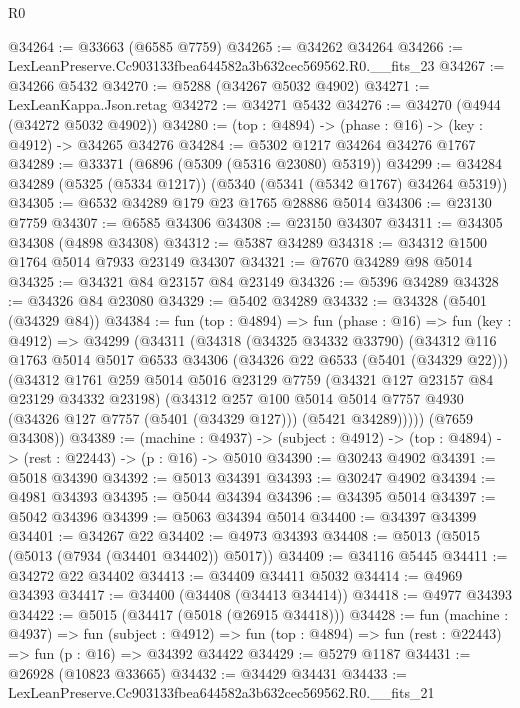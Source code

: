 \begin{lexlean}{R0}
\begin{coremodule}
@34264 := @33663 (@6585 @7759)
@34265 := @34262 @34264
@34266 := LexLeanPreserve.Cc903133fbea644582a3b632cec569562.R0.__fits_23
@34267 := @34266 @5432
@34270 := @5288 (@34267 @5032 @4902)
@34271 := LexLeanKappa.Json.retag
@34272 := @34271 @5432
@34276 := @34270 (@4944 (@34272 @5032 @4902))
@34280 := (top : @4894) -> (phase : @16) -> (key : @4912) -> @34265 @34276
@34284 := @5302 @1217 @34264 @34276 @1767
@34289 := @33371 (@6896 (@5309 (@5316 @23080) @5319))
@34299 := @34284 @34289 (@5325 (@5334 @1217)) (@5340 (@5341 (@5342 @1767) @34264 @5319))
@34305 := @6532 @34289 @179 @23 @1765 @28886 @5014
@34306 := @23130 @7759
@34307 := @6585 @34306
@34308 := @23150 @34307
@34311 := @34305 @34308 (@4898 @34308)
@34312 := @5387 @34289
@34318 := @34312 @1500 @1764 @5014 @7933 @23149 @34307
@34321 := @7670 @34289 @98 @5014
@34325 := @34321 @84 @23157 @84 @23149
@34326 := @5396 @34289
@34328 := @34326 @84 @23080
@34329 := @5402 @34289
@34332 := @34328 (@5401 (@34329 @84))
@34384 := fun (top : @4894) =>
  fun (phase : @16) =>
  fun (key : @4912) =>
  @34299
    (@34311
      (@34318
        (@34325 @34332 @33790)
        (@34312
          @116
          @1763
          @5014
          @5017
          @6533
          @34306
          (@34326 @22 @6533 (@5401 (@34329 @22)))
          (@34312
            @1761
            @259
            @5014
            @5016
            @23129
            @7759
            (@34321 @127 @23157 @84 @23129 @34332 @23198)
            (@34312
              @257
              @100
              @5014
              @5014
              @7757
              @4930
              (@34326 @127 @7757 (@5401 (@34329 @127)))
              (@5421 @34289)))))
      (@7659 @34308))
@34389 := (machine : @4937) ->
  (subject : @4912) -> (top : @4894) -> (rest : @22443) -> (p : @16) -> @5010
@34390 := @30243 @4902
@34391 := @5018 @34390
@34392 := @5013 @34391
@34393 := @30247 @4902
@34394 := @4981 @34393
@34395 := @5044 @34394
@34396 := @34395 @5014
@34397 := @5042 @34396
@34399 := @5063 @34394 @5014
@34400 := @34397 @34399
@34401 := @34267 @22
@34402 := @4973 @34393
@34408 := @5013 (@5015 (@5013 (@7934 (@34401 @34402)) @5017))
@34409 := @34116 @5445
@34411 := @34272 @22 @34402
@34413 := @34409 @34411 @5032
@34414 := @4969 @34393
@34417 := @34400 (@34408 (@34413 @34414))
@34418 := @4977 @34393
@34422 := @5015 (@34417 (@5018 (@26915 @34418)))
@34428 := fun (machine : @4937) =>
  fun (subject : @4912) =>
  fun (top : @4894) => fun (rest : @22443) => fun (p : @16) => @34392 @34422
@34429 := @5279 @1187
@34431 := @26928 (@10823 @33665)
@34432 := @34429 @34431
@34433 := LexLeanPreserve.Cc903133fbea644582a3b632cec569562.R0.__fits_21

\end{coremodule}
\end{lexlean}
